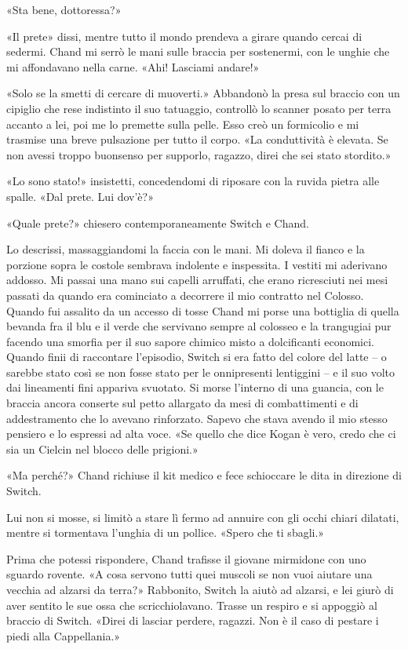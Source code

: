 «Sta bene, dottoressa?»

«Il prete» dissi, mentre tutto il mondo prendeva a girare quando cercai
di sedermi. Chand mi serrò le mani sulle braccia per sostenermi, con le
unghie che mi affondavano nella carne. «Ahi! Lasciami andare!»

«Solo se la smetti di cercare di muoverti.» Abbandonò la presa sul
braccio con un cipiglio che rese indistinto il suo tatuaggio, controllò
lo scanner posato per terra accanto a lei, poi me lo premette sulla
pelle. Esso creò un formicolio e mi trasmise una breve pulsazione per
tutto il corpo. «La conduttività è elevata. Se non avessi troppo
buonsenso per supporlo, ragazzo, direi che sei stato stordito.»

«Lo sono stato!» insistetti, concedendomi di riposare con la ruvida
pietra alle spalle. «Dal prete. Lui dov'è?»

«Quale prete?» chiesero contemporaneamente Switch e Chand.

Lo descrissi, massaggiandomi la faccia con le mani. Mi doleva il fianco
e la porzione sopra le costole sembrava indolente e inspessita. I
vestiti mi aderivano addosso. Mi passai una mano sui capelli arruffati,
che erano ricresciuti nei mesi passati da quando era cominciato a
decorrere il mio contratto nel Colosso. Quando fui assalito da un
accesso di tosse Chand mi porse una bottiglia di quella bevanda fra il
blu e il verde che servivano sempre al colosseo e la trangugiai pur
facendo una smorfia per il suo sapore chimico misto a dolcificanti
economici. Quando finii di raccontare l'episodio, Switch si era fatto
del colore del latte -- o sarebbe stato così se non fosse stato per le
onnipresenti lentiggini -- e il suo volto dai lineamenti fini appariva
svuotato. Si morse l'interno di una guancia, con le braccia ancora
conserte sul petto allargato da mesi di combattimenti e di addestramento
che lo avevano rinforzato. Sapevo che stava avendo il mio stesso
pensiero e lo espressi ad alta voce. «Se quello che dice Kogan è vero,
credo che ci sia un Cielcin nel blocco delle prigioni.»

«Ma perché?» Chand richiuse il kit medico e fece schioccare le dita in
direzione di Switch.

Lui non si mosse, si limitò a stare lì fermo ad annuire con gli occhi
chiari dilatati, mentre si tormentava l'unghia di un pollice. «Spero che
ti sbagli.»

Prima che potessi rispondere, Chand trafisse il giovane mirmidone con
uno sguardo rovente. «A cosa servono tutti quei muscoli se non vuoi
aiutare una vecchia ad alzarsi da terra?» Rabbonito, Switch la aiutò ad
alzarsi, e lei giurò di aver sentito le sue ossa che scricchiolavano.
Trasse un respiro e si appoggiò al braccio di Switch. «Direi di lasciar
perdere, ragazzi. Non è il caso di pestare i piedi alla Cappellania.»


